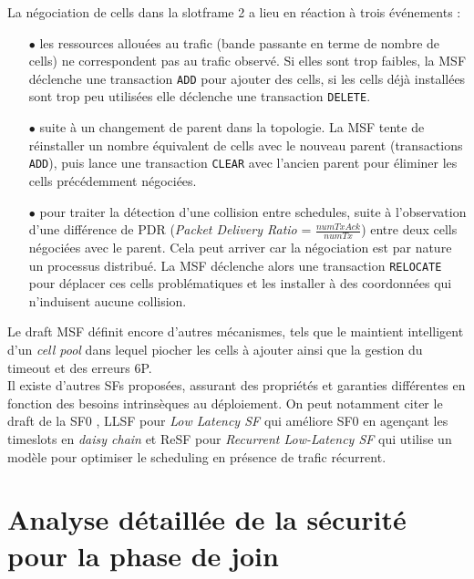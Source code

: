 \documentclass[]{report}
\begin{document}
\par La négociation de cells dans la slotframe 2 a lieu en réaction à trois événements :
\begin{itemize}
\item[$\bullet$] les ressources allouées au trafic (bande passante en terme de nombre de cells) ne correspondent pas au trafic observé. Si elles sont trop faibles, la MSF déclenche une transaction \texttt{ADD} pour ajouter des cells, si les cells déjà installées sont trop peu utilisées elle déclenche une transaction \texttt{DELETE}. 
\vspace{0.1cm}
\item[$\bullet$] suite à un changement de parent dans la topologie. La MSF tente de réinstaller un nombre équivalent de cells avec le nouveau parent (transactions \texttt{ADD}), puis lance une transaction \texttt{CLEAR} avec l'ancien parent pour éliminer les cells précédemment négociées.
\vspace{0.1cm}
\item[$\bullet$] pour traiter la détection d'une collision entre schedules, suite à l'observation d'une différence de PDR (\textit{Packet Delivery Ratio} = $\frac{numTxAck}{numTx}$) entre deux cells négociées avec le parent. Cela peut arriver car la négociation est par nature un processus distribué. La MSF déclenche alors une transaction \texttt{RELOCATE} pour déplacer ces cells problématiques et les installer à des coordonnées qui n'induisent aucune collision.
\end{itemize}

\vspace{0.4cm}

\par Le draft MSF \cite{ietf-6tisch-msf-10} définit encore d'autres mécanismes, tels que le maintient intelligent d'un \textit{cell pool} dans lequel piocher les cells à ajouter ainsi que la gestion du timeout et des erreurs 6P.\\

Il existe d'autres SFs proposées, assurant des propriétés et garanties différentes en fonction des besoins intrinsèques au déploiement. On peut notamment citer le draft de la SF0 \cite{ietf-6tisch-6top-sf0-05}, LLSF pour \textit{Low Latency SF} \cite{LLSF} qui améliore SF0 en agençant les timeslots en \textit{daisy chain} et ReSF pour \textit{Recurrent Low-Latency SF} \cite{ReSF} qui utilise un modèle pour optimiser le scheduling en présence de trafic récurrent.

	
\chapter{Analyse détaillée de la sécurité pour la phase de join}
\label{joining_analysis}
\newpage
\end{document}
